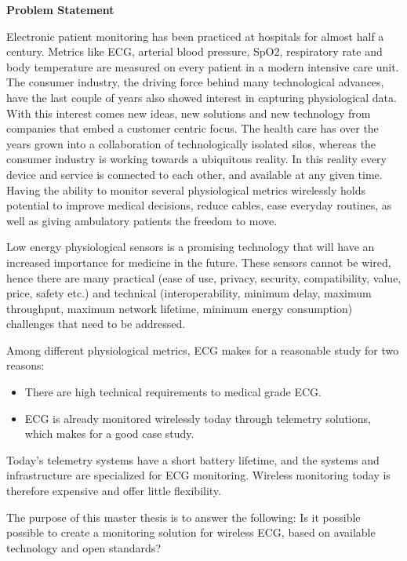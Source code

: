 \noindent
\textbf{Problem Statement} 
\newline 
	
\noindent 
Electronic patient monitoring has been practiced at hospitals for almost half a century. Metrics like ECG, arterial blood pressure, SpO2, respiratory rate and body temperature are measured on every patient in a modern intensive care unit. The consumer industry, the driving force behind many technological advances, have the last couple of years also showed interest in capturing physiological data. With this interest comes new ideas, new solutions and new technology from companies that embed a customer centric focus. The health care has over the years grown into a collaboration of technologically isolated silos, whereas the consumer industry is working towards a ubiquitous reality. In this reality every device and service is connected to each other, and available at any given time. Having the ability to monitor several physiological metrics wirelessly holds potential to improve medical decisions, reduce cables, ease everyday routines, as well as giving ambulatory patients the freedom to move. 
	
	Low energy physiological sensors is a promising technology that will have an increased importance for medicine in the future. These sensors cannot be wired, hence there are many practical (ease of use, privacy, security, compatibility, value, price, safety etc.) and technical (interoperability, minimum delay, maximum throughput, maximum network lifetime, minimum energy consumption) challenges that need to be addressed.
	
	Among different physiological metrics, ECG makes for a reasonable study for two reasons: 
	\begin{itemize}
		\item There are high technical requirements to medical grade ECG. 
		\item ECG is already monitored wirelessly today through telemetry solutions, which makes for a good case study. 
	\end{itemize}

\noindent	
Today's telemetry systems have a short battery lifetime, and the systems and infrastructure are specialized for ECG monitoring. Wireless monitoring today is therefore expensive and offer little flexibility. 

The purpose of this master thesis is to answer the following: Is it possible possible to create a monitoring solution for wireless ECG, based on available technology and open standards?
